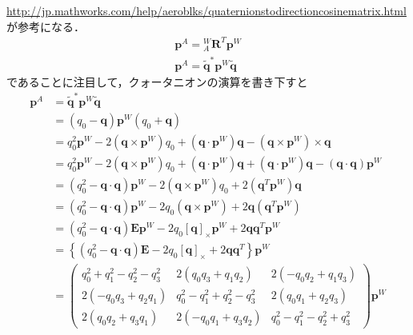 \url{http://jp.mathworks.com/help/aeroblks/quaternionstodirectioncosinematrix.html}が参考になる．
\begin{gather}
  \boldsymbol{p}^{A} = {}^{W}_{A}\boldsymbol{R}^{T} \boldsymbol{p}^{W}\\
  \boldsymbol{p}^{A} = \tilde{\boldsymbol{q}}^{\ast} \boldsymbol{p}^{W} \tilde{\boldsymbol{q}}
\end{gather}
であることに注目して，クォータニオンの演算を書き下すと
{\tiny
  \begin{align}
    \boldsymbol{p}^{A} &= \tilde{\boldsymbol{q}}^{\ast} \boldsymbol{p}^{W} \tilde{\boldsymbol{q}}\\
    &= \left(q_0 - \boldsymbol{q}\right) \boldsymbol{p}^{W} \left(q_0 + \boldsymbol{q}\right)\\
    &= q_0^2 \boldsymbol{p}^{W} - 2 \left(\boldsymbol{q} \times \boldsymbol{p}^{W}\right) q_0 + \left(\boldsymbol{q} \cdot \boldsymbol{p}^{W}\right) \boldsymbol{q} - \left(\boldsymbol{q} \times \boldsymbol{p}^{W}\right) \times \boldsymbol{q}\\
    &= q_0^2 \boldsymbol{p}^{W} - 2 \left(\boldsymbol{q} \times \boldsymbol{p}^{W}\right) q_0 + \left(\boldsymbol{q} \cdot \boldsymbol{p}^{W}\right) \boldsymbol{q} + \left(\boldsymbol{q} \cdot \boldsymbol{p}^{W}\right) \boldsymbol{q} - \left(\boldsymbol{q} \cdot \boldsymbol{q}\right) \boldsymbol{p}^{W}\\
    &= \left(q_0^2 - \boldsymbol{q} \cdot \boldsymbol{q}\right) \boldsymbol{p}^{W} - 2 \left(\boldsymbol{q} \times \boldsymbol{p}^{W}\right) q_0 + 2\left(\boldsymbol{q}^{T} \boldsymbol{p}^{W}\right) \boldsymbol{q}\\
    &= \left(q_0^2 - \boldsymbol{q} \cdot \boldsymbol{q}\right) \boldsymbol{p}^{W} - 2 q_0 \left(\boldsymbol{q} \times \boldsymbol{p}^{W}\right) + 2 \boldsymbol{q} \left(\boldsymbol{q}^{T} \boldsymbol{p}^{W}\right)\\
    &= \left(q_0^2 - \boldsymbol{q} \cdot \boldsymbol{q}\right) \boldsymbol{E} \boldsymbol{p}^{W} - 2q_0 [\boldsymbol{q}]_{\times} \boldsymbol{p}^{W} + 2 \boldsymbol{q} \boldsymbol{q}^{T} \boldsymbol{p}^{W}\\
    &= \left\{\left(q_0^2 - \boldsymbol{q} \cdot \boldsymbol{q}\right) \boldsymbol{E} - 2q_0 [\boldsymbol{q}]_{\times} + 2 \boldsymbol{q} \boldsymbol{q}^{T}\right\} \boldsymbol{p}^{W}\\
    &= \begin{pmatrix}
      q_0^2+q_1^2-q_2^2-q_3^2 & 2\left(q_0 q_3 + q_1 q_2\right) & 2\left(- q_0 q_2 + q_1 q_3\right)\\
      2\left(- q_0 q_3 + q_2 q_1\right) & q_0^2-q_1^2+q_2^2-q_3^2 & 2\left(q_0 q_1 + q_2 q_3\right)\\
      2\left(q_0 q_2 + q_3 q_1\right) & 2\left(- q_0 q_1 + q_3 q_2\right) & q_0^2-q_1^2-q_2^2+q_3^2
    \end{pmatrix}
    \boldsymbol{p}^{W}
  \end{align}
}
